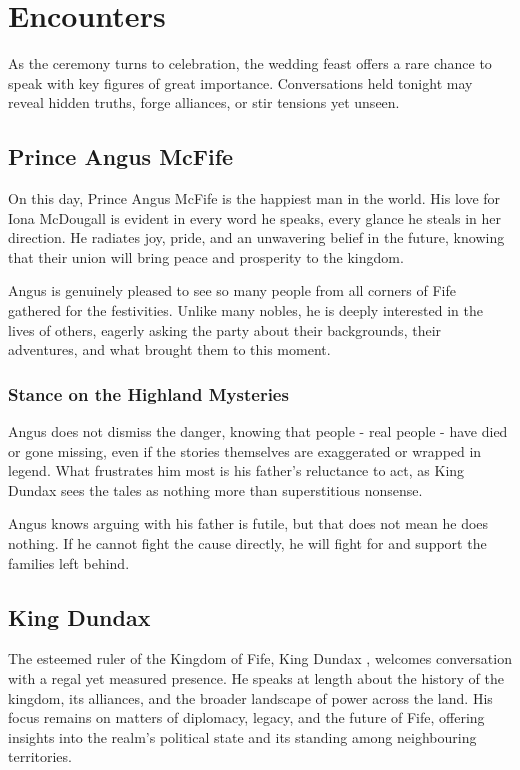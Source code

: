 \vfill\clearpage

\section*{Encounters}
{\entryfont As the ceremony turns to celebration, the wedding feast offers a rare chance to speak with key figures of great importance. Conversations held tonight may reveal hidden truths, forge alliances, or stir tensions yet unseen.}

\subsection*{Prince Angus McFife}
{\entryfont On this day, Prince Angus McFife is the happiest man in the world. His love for Iona McDougall is evident in every word he speaks, every glance he steals in her direction. He radiates joy, pride, and an unwavering belief in the future, knowing that their union will bring peace and prosperity to the kingdom.

Angus is genuinely pleased to see so many people from all corners of Fife gathered for the festivities. Unlike many nobles, he is deeply interested in the lives of others, eagerly asking the party about their backgrounds, their adventures, and what brought them to this moment.}
\subsubsection*{Stance on the Highland Mysteries}
{\entryfont Angus does not dismiss the danger, knowing that people - real people - have died or gone missing, even if the stories themselves are exaggerated or wrapped in legend. What frustrates him most is his father's reluctance to act, as King Dundax  sees the tales as nothing more than superstitious nonsense.

Angus knows arguing with his father is futile, but that does not mean he does nothing. If he cannot fight the cause directly, he will fight for and support the families left behind.}
\subsection*{King Dundax }
{\entryfont The esteemed ruler of the Kingdom of Fife, King Dundax , welcomes conversation with a regal yet measured presence. He speaks at length about the history of the kingdom, its alliances, and the broader landscape of power across the land. His focus remains on matters of diplomacy, legacy, and the future of Fife, offering insights into the realm's political state and its standing among neighbouring territories.}
